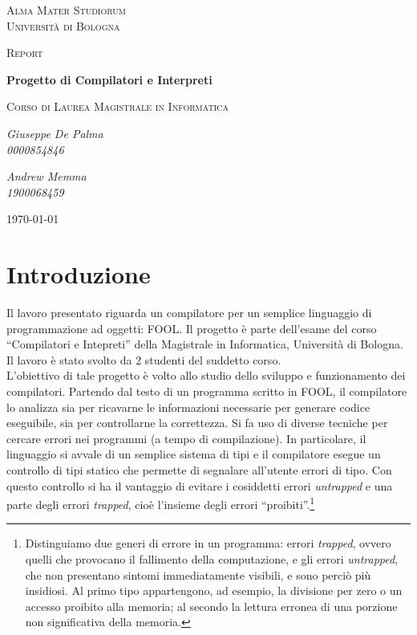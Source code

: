 \documentclass{scrreprt}
\begin{document}
\begin{titlepage}
	\centering
	{\scshape\LARGE Alma Mater Studiorum\\Università di Bologna \par}
	\vspace{1cm}
	{\scshape\Large Report\par}
	\vspace{1.5cm}
    {\huge\bfseries Progetto di Compilatori e Interpreti\par}
    \vspace{0.5cm}
    {\scshape\Large Corso di Laurea Magistrale in Informatica\par}
	\vspace{2cm}
    {\Large\itshape Giuseppe De Palma \\0000854846\par}
	\vspace{0.5cm}    
    {\Large\itshape Andrew Memma \\1900068459\par}
    \vfill

	{\large \today\par}
\end{titlepage}

\tableofcontents

\chapter{Introduzione}
Il lavoro presentato riguarda un compilatore per un semplice linguaggio di programmazione ad oggetti: FOOL. Il progetto è parte dell'esame del corso ``Compilatori e Intepreti'' della Magistrale in Informatica, Università di Bologna. Il lavoro è stato svolto da 2 studenti del suddetto corso.\\

L'obiettivo di tale progetto è volto allo studio dello sviluppo e funzionamento dei compilatori. Partendo dal testo di un programma scritto in FOOL, il compilatore lo analizza sia per ricavarne le informazioni necessarie per generare codice eseguibile, sia per controllarne la correttezza. Si fa uso di diverse tecniche per cercare errori nei programmi (a tempo di compilazione). In particolare, il linguaggio si avvale di un semplice sistema di tipi e il compilatore esegue un controllo di tipi statico che permette di segnalare all'utente errori di tipo. Con questo controllo si ha il vantaggio di evitare i cosiddetti errori \textit{untrapped} e una parte degli errori \textit{trapped}, cioè l'insieme degli errori ``proibiti''.\footnote{Distinguiamo due generi di errore in un programma: errori \textit{trapped}, ovvero quelli che provocano il fallimento della computazione, e gli errori	\textit{untrapped}, che non	presentano sintomi immediatamente visibili, e sono perciò più insidiosi. Al primo tipo appartengono, ad esempio, la divisione per zero o un accesso proibito alla memoria; al secondo la lettura erronea di una porzione non significativa della memoria.}\\
\end{document}
